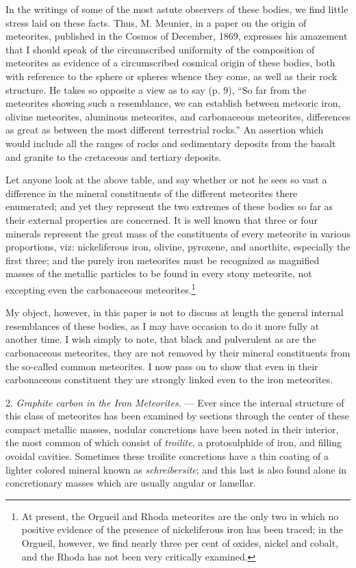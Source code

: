 \documentclass[a4paper, 11pt, oneside, english]{article}
\begin{document}
In the writings of some of the most astute observers of these bodies, we find little stress laid on these facts. Thus, M. Meunier, in a paper on the origin of meteorites, published in the Cosmos of December, 1869, expresses his amazement that I should speak of the circumscribed uniformity of the composition of meteorites as evidence of a circumscribed cosmical origin of these bodies, both with reference to the sphere or spheres whence they come, as well as their rock structure. He takes so opposite a view as to say (p. 9), ``So far from the meteorites showing such a resemblance, we can establish between meteoric iron, olivine meteorites, aluminous meteorites, and carbonaceous meteorites, differences as great as between the most different terrestrial rocks.'' An assertion which would include all the ranges of rocks and sedimentary deposits from the basalt and granite to the cretaceous and tertiary deposits.

Let anyone look at the above table, and say whether or not he sees so vast a difference in the mineral constituents of the different meteorites there enumerated; and yet they represent the two extremes of these bodies so far as their external properties are concerned. It is well known that three or four minerals represent the great mass of the constituents of every meteorite in various proportions, viz: nickeliferous iron, olivine, pyroxene, and anorthite, especially the first three; and the purely iron meteorites must be recognized as magnified masses of the metallic particles to be found in every stony meteorite, not excepting even the carbonaceous meteorites.\footnote{At present, the Orgueil and Rhoda meteorites are the only two in which no positive evidence of the presence of nickeliferous iron has been traced; in the Orgueil, however, we find nearly three per cent of oxides, nickel and cobalt, and the Rhoda has not been very critically examined.}

My object, however, in this paper is not to discuss at length the general internal resemblances of these bodies, as I may have occasion to do it more fully at another time. I wish simply to note, that black and pulverulent as are the carbonaceous meteorites, they are not removed by their mineral constituents from the so-called common meteorites. I now pass on to show that even in their carbonaceous constituent they are strongly linked even to the iron meteorites.

2. \emph{Graphite carbon in the Iron Meteorites.} --- Ever since the internal structure of this class of meteorites has been examined by sections through the center of these compact metallic masses, nodular concretions have been noted in their interior, the most common of which consist of \emph{troilite}, a protosulphide of iron, and filling ovoidal cavities. Sometimes these troilite concretions have a thin coating of a lighter colored mineral known as \emph{schreibersite}; and this last is also found alone in concretionary masses which are usually angular or lamellar.
\end{document}
